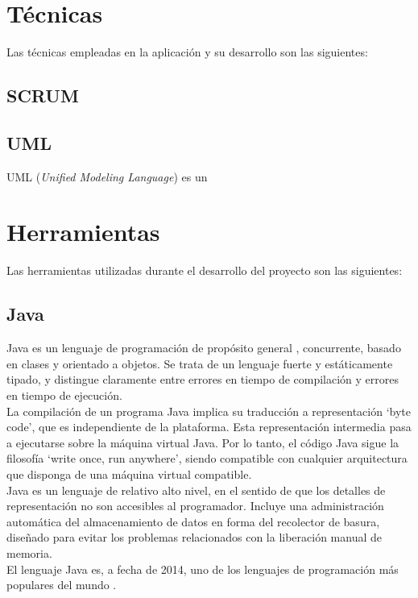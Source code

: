 
\section{Técnicas}
Las técnicas empleadas en la aplicación y su desarrollo son las siguientes:

\subsection{SCRUM}

\subsection{UML}
UML (\emph{Unified Modeling Language}) es un

\section{Herramientas}
Las herramientas utilizadas durante el desarrollo del proyecto son las siguientes:

\subsection{Java}
Java es un lenguaje de programación de propósito general \cite{jls8}, concurrente, basado en clases y orientado a objetos.
Se trata de un lenguaje fuerte y estáticamente tipado, y distingue claramente entre errores en tiempo de compilación y errores en tiempo de ejecución.
\\
La compilación de un programa Java implica su traducción a representación `byte code', que es independiente de la plataforma.
Esta representación intermedia pasa a ejecutarse sobre la máquina virtual Java.
Por lo tanto, el código Java sigue la filosofía `write once, run anywhere', siendo compatible con cualquier arquitectura que disponga de una máquina virtual compatible.
\\
Java es un lenguaje de relativo alto nivel, en el sentido de que los detalles de representación no son accesibles al programador.
Incluye una administración automática del almacenamiento de datos en forma del recolector de basura, diseñado para evitar los problemas relacionados con la liberación manual de memoria.
\\
El lenguaje Java es, a fecha de 2014, uno de los lenguajes de programación más populares del mundo \cite{website:tiobe}.


